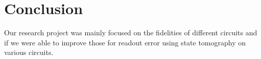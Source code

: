 \section{Conclusion}

Our research project was mainly focused on the fidelities of different circuits and if we were able to improve those for readout error using state tomography on various circuits.  
